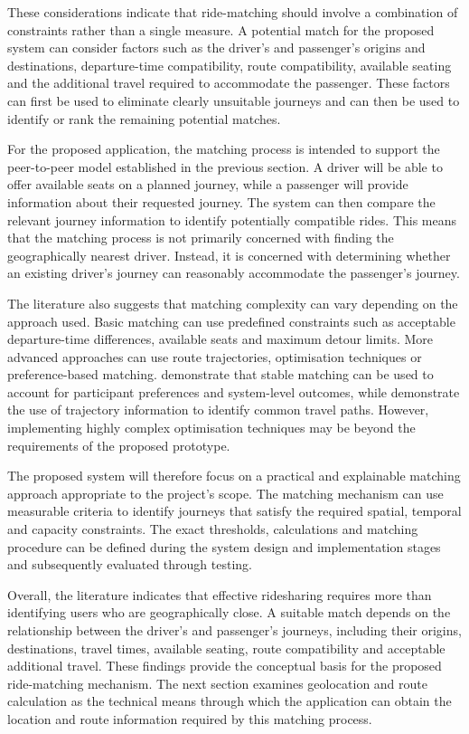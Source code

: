 These considerations indicate that ride-matching should involve a combination of constraints rather than a single measure. A potential match for the proposed system can consider factors such as the driver's and passenger's origins and destinations, departure-time compatibility, route compatibility, available seating and the additional travel required to accommodate the passenger. These factors can first be used to eliminate clearly unsuitable journeys and can then be used to identify or rank the remaining potential matches.

For the proposed application, the matching process is intended to support the peer-to-peer model established in the previous section. A driver will be able to offer available seats on a planned journey, while a passenger will provide information about their requested journey. The system can then compare the relevant journey information to identify potentially compatible rides. This means that the matching process is not primarily concerned with finding the geographically nearest driver. Instead, it is concerned with determining whether an existing driver's journey can reasonably accommodate the passenger's journey.

The literature also suggests that matching complexity can vary depending on the approach used. Basic matching can use predefined constraints such as acceptable departure-time differences, available seats and maximum detour limits. More advanced approaches can use route trajectories, optimisation techniques or preference-based matching. \citet{wang2018} demonstrate that stable matching can be used to account for participant preferences and system-level outcomes, while \citet{hong2017} demonstrate the use of trajectory information to identify common travel paths. However, implementing highly complex optimisation techniques may be beyond the requirements of the proposed prototype.

The proposed system will therefore focus on a practical and explainable matching approach appropriate to the project's scope. The matching mechanism can use measurable criteria to identify journeys that satisfy the required spatial, temporal and capacity constraints. The exact thresholds, calculations and matching procedure can be defined during the system design and implementation stages and subsequently evaluated through testing.

Overall, the literature indicates that effective ridesharing requires more than identifying users who are geographically close. A suitable match depends on the relationship between the driver's and passenger's journeys, including their origins, destinations, travel times, available seating, route compatibility and acceptable additional travel. These findings provide the conceptual basis for the proposed ride-matching mechanism. The next section examines geolocation and route calculation as the technical means through which the application can obtain the location and route information required by this matching process.

